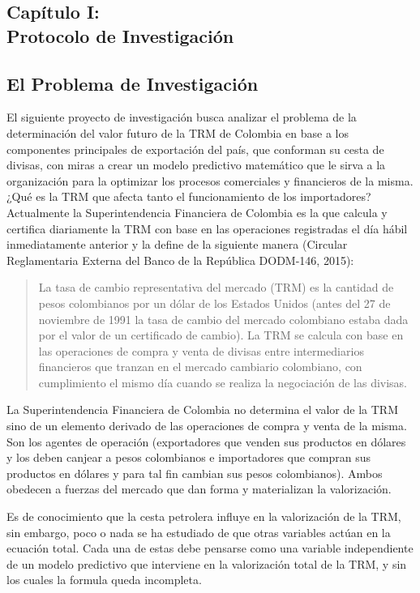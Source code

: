 \begin{spacing}{1.5}
\setcounter{chapter}{0}
\chapter{Capítulo I: \\Protocolo de Investigación}
\thispagestyle{empty}

\section{El Problema de Investigación}
El siguiente proyecto de investigación busca analizar el problema de la determinación del valor futuro de la TRM de Colombia en base a los componentes principales de exportación del país, que conforman su cesta de divisas, con miras a crear un modelo predictivo matemático que le sirva a la organización para la optimizar los procesos comerciales y financieros de la misma. ¿Qué es la TRM que afecta tanto el funcionamiento de los importadores? Actualmente la Superintendencia Financiera de Colombia es la que calcula y certifica diariamente la TRM con base en las operaciones registradas el día hábil inmediatamente anterior y la define de la siguiente manera (Circular Reglamentaria Externa del Banco de la República DODM-146, 2015):

\begin{quotation}
	La tasa de cambio representativa del mercado (TRM) es la cantidad de pesos colombianos por un dólar de los Estados Unidos (antes del 27 de noviembre de 1991 la tasa de cambio del mercado colombiano estaba dada por el valor de un certificado de cambio). La TRM se calcula con base en las operaciones de compra y venta de divisas entre intermediarios financieros que tranzan en el mercado cambiario colombiano, con cumplimiento el mismo día cuando se realiza la negociación de las divisas.
\end{quotation}

La Superintendencia Financiera de Colombia no determina el valor de la TRM sino de un elemento derivado de las operaciones de compra y venta de la misma. Son los agentes de operación (exportadores que venden sus productos en dólares y los deben canjear a pesos colombianos e importadores que compran sus productos en dólares y para tal fin cambian sus pesos colombianos). Ambos obedecen a fuerzas del mercado que dan forma y materializan la valorización. 

Es de conocimiento que la cesta petrolera influye en la valorización de la TRM, sin embargo, poco o nada se ha estudiado de que otras variables actúan en la ecuación total. Cada una de estas debe pensarse como una variable independiente de un modelo predictivo que interviene en la valorización total de la TRM, y sin los cuales la formula queda incompleta.


\end{spacing}
